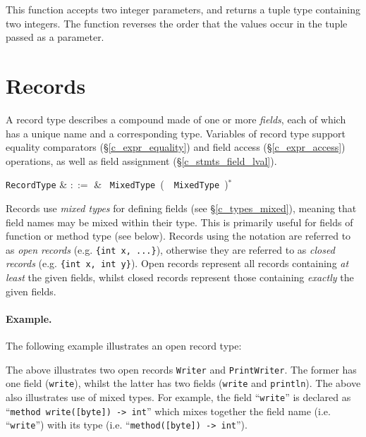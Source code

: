 This function accepts two integer parameters, and returns a tuple type containing two integers.  The function reverses the order that the values occur in the tuple passed as a parameter.
 

\section{Records}
\label{c_types_record}

A record type describes a compound made of one or more {\em fields}, each of which has a unique name and a corresponding type.  Variables of record type support equality comparators (\S\ref{c_expr_equality}) and field access (\S\ref{c_expr_access}) operations, as well as field assignment (\S\ref{c_stmts_field_lval}).

\begin{syntax}
  \verb+RecordType+ & $::=$ & \token{\{}\ \verb+MixedType+\
  \big(\ \token{,}\ \verb+MixedType+\
  \big)$^*$ \ \token{\}}\\
\end{syntax}

Records use {\em mixed types} for defining fields (see \S\ref{c_types_mixed}), meaning that field names may be mixed within their type.  This is primarily useful for fields of function or method type (see below).  Records using the  notation are referred to as {\em open records} (e.g. \lstinline|{int x, ...}|), otherwise they are referred to as {\em closed records} (e.g. \lstinline|{int x, int y}|).  Open records represent all records containing {\em at least} the given fields, whilst closed records represent those containing {\em exactly} the given fields.   
\paragraph{Example.} The following example illustrates an open record type: 



The above illustrates two open records \lstinline{Writer} and \lstinline{PrintWriter}.  The former has one field (\lstinline{write}), whilst the latter has two fields (\lstinline{write} and \lstinline{println}).  The above also illustrates use of mixed types.  For example, the field ``\lstinline{write}'' is declared as ``\lstinline{method write([byte]) -> int}'' which mixes together the field name (i.e. ``\lstinline{write}'') with its type (i.e. ``\lstinline{method([byte]) -> int}'').

